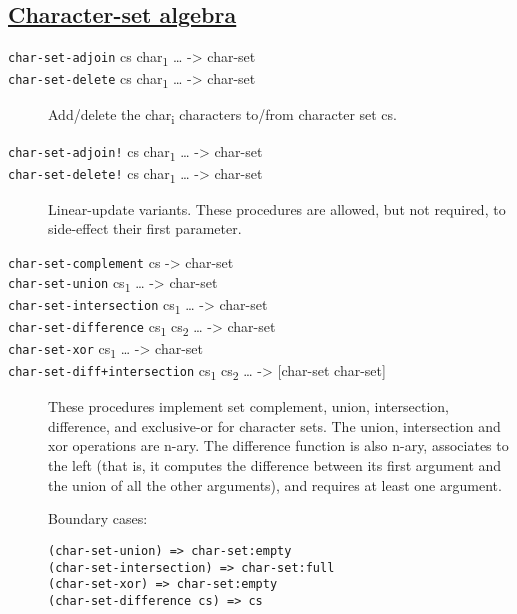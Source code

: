 \subsection{\texorpdfstring{\href{}{Character-set
algebra}}{Character-set algebra}}\label{character-set-algebra}

\begin{description}
\item[ \href{}{} \href{}{} \texttt{char-set-adjoin} cs
char\textsubscript{1} \ldots{} -\textgreater{} char-set\\
\texttt{char-set-delete} cs char\textsubscript{1} \ldots{}
-\textgreater{} char-set ]
Add/delete the char\textsubscript{i} characters to/from character set
cs.
\item[ \href{}{} \href{}{} \texttt{char-set-adjoin!} cs
char\textsubscript{1} \ldots{} -\textgreater{} char-set\\
\texttt{char-set-delete!} cs char\textsubscript{1} \ldots{}
-\textgreater{} char-set ]
Linear-update variants. These procedures are allowed, but not required,
to side-effect their first parameter.
\item[ \href{}{} \href{}{} \href{}{} \href{}{} \href{}{} \href{}{}
\texttt{char-set-complement} cs -\textgreater{} char-set\\
\texttt{char-set-union} cs\textsubscript{1} \ldots{} -\textgreater{}
char-set\\
\texttt{char-set-intersection} cs\textsubscript{1} \ldots{}
-\textgreater{} char-set\\
\texttt{char-set-difference} cs\textsubscript{1} cs\textsubscript{2}
\ldots{} -\textgreater{} char-set\\
\texttt{char-set-xor} cs\textsubscript{1} \ldots{} -\textgreater{}
char-set\\
\texttt{char-set-diff+intersection} cs\textsubscript{1}
cs\textsubscript{2} \ldots{} -\textgreater{} {[}char-set char-set{]} ]
These procedures implement set complement, union, intersection,
difference, and exclusive-or for character sets. The union, intersection
and xor operations are n-ary. The difference function is also n-ary,
associates to the left (that is, it computes the difference between its
first argument and the union of all the other arguments), and requires
at least one argument.

Boundary cases:

\begin{verbatim}
(char-set-union) => char-set:empty
(char-set-intersection) => char-set:full
(char-set-xor) => char-set:empty
(char-set-difference cs) => cs
\end{verbatim}


\end{description}
